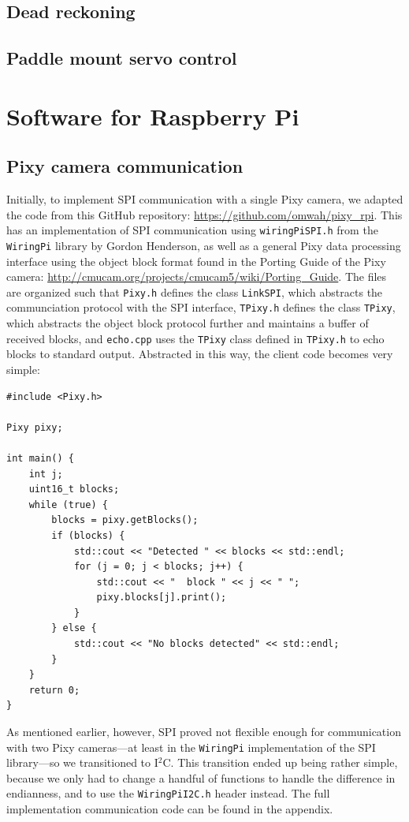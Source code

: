 \documentclass[letterpaper, 11pt]{article}
\newcommand{\iic}{I$^2$C\xspace}
\begin{document}
\begin{enumerate}[label=\textbf{\arabic*.}]
\subsection{Dead reckoning}

\subsection{Paddle mount servo control}

\section{Software for Raspberry Pi}
\subsection{Pixy camera communication}
Initially, to implement SPI communication with a single Pixy camera, we adapted the code from this GitHub repository: \url{https://github.com/omwah/pixy_rpi}. This has an implementation of SPI communication using \verb|wiringPiSPI.h| from the \verb|WiringPi| library by Gordon Henderson, as well as a general Pixy data processing interface using the object block format found in the Porting Guide of the Pixy camera: \url{http://cmucam.org/projects/cmucam5/wiki/Porting_Guide}. The files are organized such that \verb|Pixy.h| defines the class \verb|LinkSPI|, which abstracts the communciation protocol with the SPI interface, \verb|TPixy.h| defines the class \verb|TPixy|, which abstracts the object block protocol further and maintains a buffer of received blocks, and \verb|echo.cpp| uses the \texttt{TPixy} class defined in \texttt{TPixy.h} to echo blocks to standard output. Abstracted in this way, the client code becomes very simple:
\begin{verbatim}
#include <Pixy.h>

Pixy pixy;

int main() {
    int j;
    uint16_t blocks;
    while (true) {
        blocks = pixy.getBlocks();
        if (blocks) {
            std::cout << "Detected " << blocks << std::endl;
            for (j = 0; j < blocks; j++) {
                std::cout << "  block " << j << " ";
                pixy.blocks[j].print();
            }
        } else {
            std::cout << "No blocks detected" << std::endl;
        }
    }
    return 0;
}
\end{verbatim}

As mentioned earlier, however, SPI proved not flexible enough for communication with two Pixy cameras---at least in the \texttt{WiringPi} implementation of the SPI library---so we transitioned to \iic. This transition ended up being rather simple, because we only had to change a handful of functions to handle the difference in endianness, and to use the \verb|WiringPiI2C.h| header instead. The full implementation communication code can be found in the appendix.


\end{enumerate}
\end{document}
